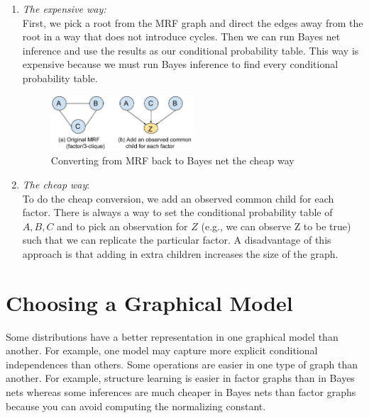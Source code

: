 \documentclass[twoside]{article}
\begin{document}
\begin{enumerate}
\begin{enumerate}
\item \textit{The expensive way:} \\
First, we pick a root from the MRF graph and direct the edges away from the root in a way that does not introduce cycles.
Then we can run Bayes net inference and use the results as our conditional probability table.
This way is expensive because we must run Bayes inference to find every conditional probability table.

\begin{figure}[h]
\caption{Converting from MRF back to Bayes net the cheap way}
\label{fig:f6}
\centering
\includegraphics[width=0.5\textwidth]{cheap}
\end{figure}

\item \textit{The cheap way}: \\
To do the cheap conversion, we add an observed common child for each factor.
There is always a way to set the conditional probability table of $A,B,C$ and to pick an observation for $Z$ 
(e.g., we can observe Z to be true) such that we can replicate the particular factor.
A disadvantage of this approach is that adding in extra children increases the size of the graph.
\end{enumerate}

\end{enumerate}

\section{Choosing a Graphical Model}
Some distributions have a better representation in one graphical model than another. For example, one model
may capture more explicit conditional independences than others.
Some operations are easier in one type of graph than another.
For example, structure learning is easier in factor graphs than in Bayes nets
whereas some inferences are much cheaper in Bayes nets than factor graphs because 
you can avoid computing the normalizing constant.
\end{document}
